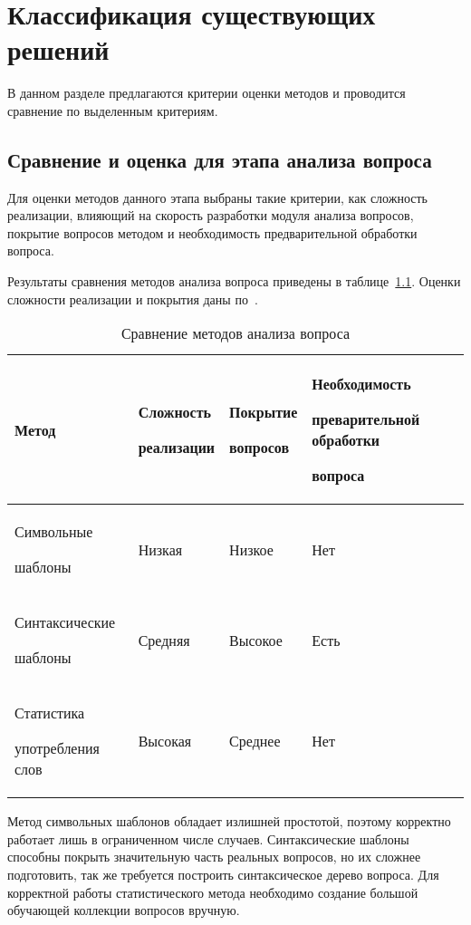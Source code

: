 \chapter{Классификация существующих решений}

В данном разделе предлагаются критерии оценки методов и проводится сравнение по выделенным критериям.

\section{Сравнение и оценка для этапа анализа вопроса}

Для оценки методов данного этапа выбраны такие критерии, как сложность реализации, влияющий на скорость разработки модуля анализа вопросов, покрытие вопросов методом и необходимость предварительной обработки вопроса. 

Результаты сравнения методов анализа вопроса приведены в таблице~\ref{tb:s1}. Оценки сложности реализации и покрытия даны по~\cite{step1}.

\begin{table}[h!]
	\begin{center}
		\begin{threeparttable}
			\captionsetup{justification=raggedright,singlelinecheck=off}
			\caption{\label{tb:s1} Сравнение методов анализа вопроса}
			\begin{tabular}{|p{3.5cm}|p{2.5cm}|p{2.5cm}|p{3.5cm}|}
				\hline
				Метод & Сложность\par реализации & Покрытие\par вопросов & Необходимость\par преварительной обработки\par вопроса \\ [0.8ex] 
				\hline
				Символьные\par шаблоны & Низкая & Низкое & Нет \\
				\hline
				Синтаксические\par шаблоны & Средняя & Высокое & Есть \\
				\hline
				Статистика\par употребления слов & Высокая & Среднее & Нет \\
				\hline
			\end{tabular}
		\end{threeparttable} 
	\end{center}
\end{table}

Метод символьных шаблонов обладает излишней простотой, поэтому корректно работает лишь в ограниченном числе случаев. Синтаксические шаблоны способны покрыть значительную часть реальных вопросов, но их сложнее подготовить, так же требуется построить синтаксическое дерево вопроса. Для корректной работы статистического метода необходимо создание большой обучающей коллекции вопросов вручную.

